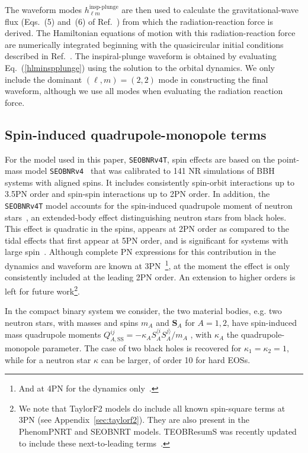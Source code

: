 \documentclass[prd,aps,letter,twocolumn,floatfix,notitlepage,nofootinbib]{revtex4-1}
\newcommand{\mr}{\mathrm}
\newcommand{\bs}{\boldsymbol}
\begin{document}
The waveform modes $h_{\ell m}^{\textrm{insp-plunge}}$ are then used to calculate the gravitational-wave flux (Eqs.~(5) and~(6) of Ref.~\cite{Dietrich:2017feu}) from which the radiation-reaction force is derived. The Hamiltonian equations of motion with this radiation-reaction force are numerically integrated beginning with the quasicircular initial conditions described in Ref.~\cite{Buonanno:2005xu}. The inspiral-plunge waveform is obtained by evaluating Eq.~(\ref{hlminspplunge}) using the solution to the orbital dynamics. We only include the dominant $(\ell,m)=(2,2)$ mode in constructing the final waveform, although we use all modes when evaluating the radiation reaction force.


\subsection{Spin-induced quadrupole-monopole terms}
\label{subsec:QM}

For the model used in this paper, \texttt{SEOBNRv4T}, spin effects are based on the point-mass model \texttt{SEOBNRv4}~\cite{Bohe:2016gbl} that was calibrated to 141 NR simulations of BBH systems with aligned spins. It includes consistently spin-orbit interactions up to 3.5PN order and spin-spin interactions up to 2PN order. In addition, the \texttt{SEOBNRv4T} model accounts for the spin-induced quadrupole moment of neutron stars~\cite{Poisson1998}, an extended-body effect distinguishing neutron stars from black holes. This effect is quadratic in the spins, appears at 2PN order as compared to the tidal effects that first appear at 5PN order, and is significant for systems with large spin~\cite{HarryHinderer2018}. Although complete PN expressions for this contribution in the dynamics and waveform are known at 3PN~\cite{Bohe:2015ana}\footnote{And at 4PN for the dynamics only~\cite{Levi:2015ixa}.}, at the moment the effect is only consistently included at the leading 2PN order. An extension to higher orders is left for future work\footnote{We note that TaylorF2 models do include all known spin-square terms at 3PN (see Appendix~\ref{sec:taylorf2}). They are also present in the PhenomPNRT and SEOBNRT models. TEOBResumS was recently updated to include these next-to-leading terms~\cite{NagarMessinaRettegno2018}.}.

In the compact binary system we consider, the two material bodies, e.g. two neutron stars, with masses and spins $m_{A}$ and $\bs{S}_{A}$ for $A=1,2$, have spin-induced mass quadrupole moments $Q_{A,\mr{SS}}^{ij}=-\kappa_A S_A^{\langle i}S_A^{j\rangle}/m_A$ \cite{Poisson1998}, with $\kappa_{A}$ the quadrupole-monopole parameter. The case of two black holes is recovered for $\kappa_1=\kappa_2=1$, while for a neutron star $\kappa$ can be larger, of order 10 for hard EOSs.
\end{document}
